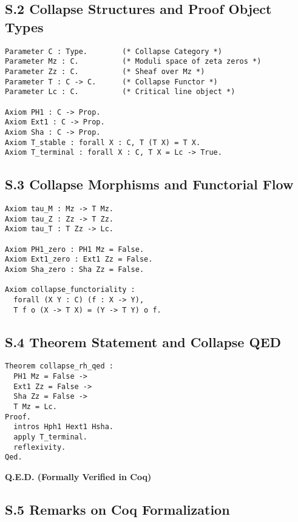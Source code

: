 \documentclass[11pt]{article}
\begin{document}
\subsection*{S.2 Collapse Structures and Proof Object Types}

\begin{lstlisting}[caption={Definition of Structures}]
Parameter C : Type.        (* Collapse Category *)
Parameter Mz : C.          (* Moduli space of zeta zeros *)
Parameter Zz : C.          (* Sheaf over Mz *)
Parameter T : C -> C.      (* Collapse Functor *)
Parameter Lc : C.          (* Critical line object *)

Axiom PH1 : C -> Prop.
Axiom Ext1 : C -> Prop.
Axiom Sha : C -> Prop.
Axiom T_stable : forall X : C, T (T X) = T X.
Axiom T_terminal : forall X : C, T X = Lc -> True.
\end{lstlisting}

\subsection*{S.3 Collapse Morphisms and Functorial Flow}

\begin{lstlisting}[caption={Collapse Morphisms}]
Axiom tau_M : Mz -> T Mz.
Axiom tau_Z : Zz -> T Zz.
Axiom tau_T : T Zz -> Lc.

Axiom PH1_zero : PH1 Mz = False.
Axiom Ext1_zero : Ext1 Zz = False.
Axiom Sha_zero : Sha Zz = False.

Axiom collapse_functoriality :
  forall (X Y : C) (f : X -> Y),
  T f o (X -> T X) = (Y -> T Y) o f.
\end{lstlisting}

\subsection*{S.4 Theorem Statement and Collapse QED}

\begin{lstlisting}[caption={Collapse RH QED Theorem}]
Theorem collapse_rh_qed :
  PH1 Mz = False ->
  Ext1 Zz = False ->
  Sha Zz = False ->
  T Mz = Lc.
Proof.
  intros Hph1 Hext1 Hsha.
  apply T_terminal.
  reflexivity.
Qed.
\end{lstlisting}


\begin{center}
\Huge
\textbf{Q.E.D. \quad (Formally Verified in Coq)}
\end{center}

\subsection*{S.5 Remarks on Coq Formalization}
\end{document}
